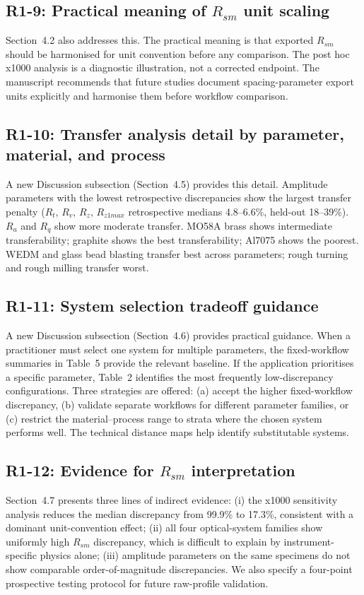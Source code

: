 \documentclass[10pt]{article}
\begin{document}
\subsection*{R1-9: Practical meaning of $R_{sm}$ unit scaling}
Section~4.2 also addresses this. The practical meaning is that exported $R_{sm}$ should be harmonised for unit convention before any comparison. The post hoc x1000 analysis is a diagnostic illustration, not a corrected endpoint. The manuscript recommends that future studies document spacing-parameter export units explicitly and harmonise them before workflow comparison.

\subsection*{R1-10: Transfer analysis detail by parameter, material, and process}
A new Discussion subsection (Section~4.5) provides this detail. Amplitude parameters with the lowest retrospective discrepancies show the largest transfer penalty ($R_t$, $R_v$, $R_z$, $R_{z1max}$ retrospective medians 4.8--6.6\%, held-out 18--39\%). $R_a$ and $R_q$ show more moderate transfer. MO58A brass shows intermediate transferability; graphite shows the best transferability; Al7075 shows the poorest. WEDM and glass bead blasting transfer best across parameters; rough turning and rough milling transfer worst.

\subsection*{R1-11: System selection tradeoff guidance}
A new Discussion subsection (Section~4.6) provides practical guidance. When a practitioner must select one system for multiple parameters, the fixed-workflow summaries in Table~5 provide the relevant baseline. If the application prioritises a specific parameter, Table~2 identifies the most frequently low-discrepancy configurations. Three strategies are offered: (a) accept the higher fixed-workflow discrepancy, (b) validate separate workflows for different parameter families, or (c) restrict the material--process range to strata where the chosen system performs well. The technical distance maps help identify substitutable systems.

\subsection*{R1-12: Evidence for $R_{sm}$ interpretation}
Section~4.7 presents three lines of indirect evidence: (i) the x1000 sensitivity analysis reduces the median discrepancy from 99.9\% to 17.3\%, consistent with a dominant unit-convention effect; (ii) all four optical-system families show uniformly high $R_{sm}$ discrepancy, which is difficult to explain by instrument-specific physics alone; (iii) amplitude parameters on the same specimens do not show comparable order-of-magnitude discrepancies. We also specify a four-point prospective testing protocol for future raw-profile validation.
\end{document}
